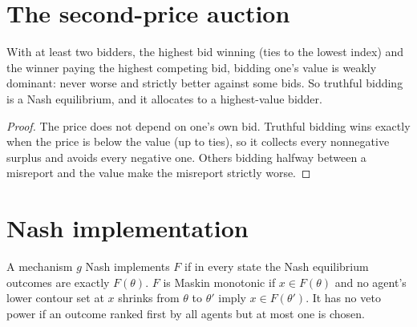 \section{The second-price auction}
\label{sec:spa}

\begin{theorem}[Vickrey 1961]
\label{thm:spa}
\leanok
{}
With at least two bidders, the highest bid winning (ties to the lowest index) and the winner paying the highest
competing bid, bidding one's value is weakly dominant: never worse and strictly better against some bids. So
truthful bidding is a Nash equilibrium, and it allocates to a highest-value bidder.
\end{theorem}
\begin{proof}
\leanok
The price does not depend on one's own bid. Truthful bidding wins exactly when the price is below the value (up to
ties), so it collects every nonnegative surplus and avoids every negative one. Others bidding halfway between a
misreport and the value make the misreport strictly worse.
\end{proof}

\section{Nash implementation}
\label{sec:maskin}

\begin{definition}
\label{def:nash-impl}
\leanok
A mechanism $g$ Nash implements $F$ if in every state the Nash equilibrium outcomes are exactly $F(\theta)$. $F$ is
Maskin monotonic if $x \in F(\theta)$ and no agent's lower contour set at $x$ shrinks from $\theta$ to $\theta'$
imply $x \in F(\theta')$. It has no veto power if an outcome ranked first by all agents but at most one is chosen.
\end{definition}


